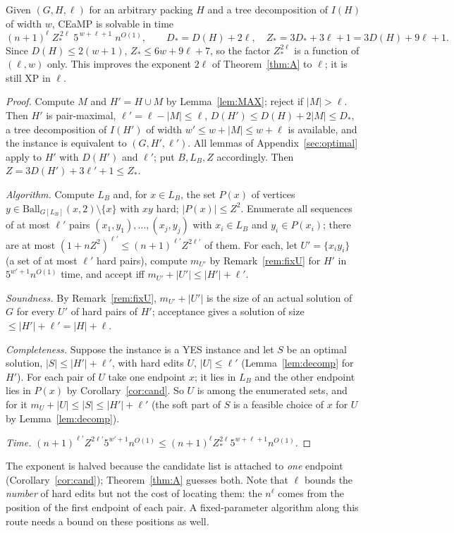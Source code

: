 \begin{theorem}\label{thm:nl}
Given $(G,H,\ell)$ for an arbitrary packing $H$ and a tree decomposition of $I(H)$ of width $w$, CEaMP is solvable in time
\[
(n+1)^{\ell}\;Z_*^{\,2\ell}\;5^{\,w+\ell+1}\;n^{O(1)},\qquad D_*=D(H)+2\ell,\quad Z_*=3D_*+3\ell+1=3D(H)+9\ell+1 .
\]
Since $D(H)\le2(w+1)$, $Z_*\le6w+9\ell+7$, so the factor $Z_*^{2\ell}$ is a function of $(\ell,w)$ only. This improves the exponent $2\ell$ of Theorem~\ref{thm:A} to $\ell$; it is still XP in $\ell$.
\end{theorem}
\begin{proof}
Compute $M$ and $H'=H\cup M$ by Lemma~\ref{lem:MAX}; reject if $|M|>\ell$. Then $H'$ is pair-maximal, $\ell'=\ell-|M|\le\ell$, $D(H')\le D(H)+2|M|\le D_*$, a tree decomposition of $I(H')$ of width $w'\le w+|M|\le w+\ell$ is available, and the instance is equivalent to $(G,H',\ell')$. All lemmas of Appendix~\ref{sec:optimal} apply to $H'$ with $D(H')$ and $\ell'$; put $B,L_B,Z$ accordingly. Then $Z=3D(H')+3\ell'+1\le Z_*$.

\emph{Algorithm.} Compute $L_B$ and, for $x\in L_B$, the set $P(x)$ of vertices $y\in\mathrm{Ball}_{G[L_B]}(x,2)\setminus\{x\}$ with $xy$ hard; $|P(x)|\le Z^2$. Enumerate all sequences of at most $\ell'$ pairs $(x_1,y_1),\dots,(x_j,y_j)$ with $x_i\in L_B$ and $y_i\in P(x_i)$; there are at most $(1+nZ^2)^{\ell'}\le(n+1)^{\ell'}Z^{2\ell'}$ of them. For each, let $U'=\{x_iy_i\}$ (a set of at most $\ell'$ hard pairs), compute $m_{U'}$ by Remark~\ref{rem:fixU} for $H'$ in $5^{w'+1}n^{O(1)}$ time, and accept iff $m_{U'}+|U'|\le|H'|+\ell'$.

\emph{Soundness.} By Remark~\ref{rem:fixU}, $m_{U'}+|U'|$ is the size of an actual solution of $G$ for every $U'$ of hard pairs of $H'$; acceptance gives a solution of size $\le|H'|+\ell'=|H|+\ell$.

\emph{Completeness.} Suppose the instance is a YES instance and let $S$ be an optimal solution, $|S|\le|H'|+\ell'$, with hard edits $U$, $|U|\le\ell'$ (Lemma~\ref{lem:decomp} for $H'$). For each pair of $U$ take one endpoint $x$; it lies in $L_B$ and the other endpoint lies in $P(x)$ by Corollary~\ref{cor:cand}. So $U$ is among the enumerated sets, and for it $m_U+|U|\le|S|\le|H'|+\ell'$ (the soft part of $S$ is a feasible choice of $x$ for $U$ by Lemma~\ref{lem:decomp}).

\emph{Time.} $(n+1)^{\ell'}Z^{2\ell'}5^{w'+1}n^{O(1)}\le(n+1)^{\ell}Z_*^{2\ell}5^{w+\ell+1}n^{O(1)}$.
\end{proof}
The exponent is halved because the candidate list is attached to \emph{one} endpoint (Corollary~\ref{cor:cand}); Theorem~\ref{thm:A} guesses both. Note that $\ell$ bounds the \emph{number} of hard edits but not the cost of locating them: the $n^{\ell}$ comes from the position of the first endpoint of each pair. A fixed-parameter algorithm along this route needs a bound on these positions as well.

